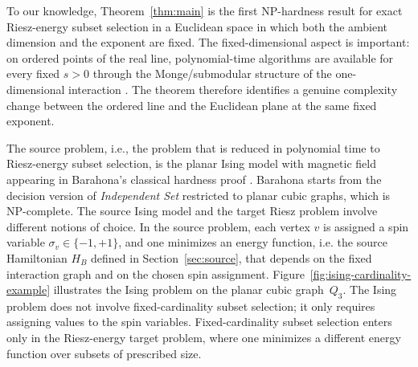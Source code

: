 \documentclass[12pt,a4paper]{article}
\begin{document}
To our knowledge, Theorem~\ref{thm:main} is the first NP-hardness result for exact Riesz-energy subset selection in a Euclidean space in which both the ambient dimension and the exponent are fixed.  The fixed-dimensional aspect is important: on ordered points of the real line, polynomial-time algorithms are available for every fixed $s>0$ through the Monge/submodular structure of the one-dimensional interaction \cite{EmmerichLine2026}.  The theorem therefore identifies a genuine complexity change between the ordered line and the Euclidean plane at the same fixed exponent.

The source problem, i.e., the problem that is reduced in polynomial time to Riesz-energy subset selection, is the planar Ising model with magnetic field appearing in Barahona's classical hardness proof \cite{Barahona1982}.  Barahona starts from the decision version of \emph{Independent Set} restricted to planar cubic graphs, which is NP-complete.  The source Ising model and the target Riesz problem involve different notions of choice.  In the source problem, each vertex $v$ is assigned a spin variable $\sigma_v\in\{-1,+1\}$, and one minimizes an energy function, i.e. the source Hamiltonian $H_B$ defined in Section~\ref{sec:source}, that depends on the fixed interaction graph and on the chosen spin assignment.   Figure~\ref{fig:ising-cardinality-example} illustrates the Ising problem  on the planar cubic graph~$Q_3$. The Ising problem does not involve fixed-cardinality subset selection; it only requires assigning values to the  spin variables.  Fixed-cardinality subset selection enters only in the Riesz-energy target problem, where one minimizes a different energy function over subsets of prescribed size.
\end{document}
